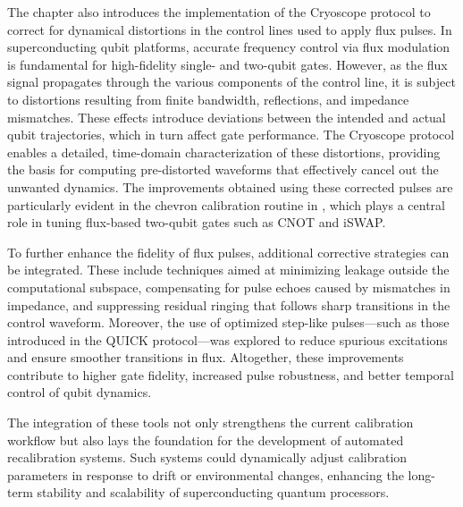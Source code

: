 The chapter also introduces the implementation of the Cryoscope protocol to correct for dynamical distortions in the control lines used to apply flux pulses. 
In superconducting qubit platforms, accurate frequency control via flux modulation is fundamental for high-fidelity single- and two-qubit gates. 
However, as the flux signal propagates through the various components of the control line, it is subject to distortions resulting from finite bandwidth, reflections, and impedance mismatches. 
These effects introduce deviations between the intended and actual qubit trajectories, which in turn affect gate performance. 
The Cryoscope protocol enables a detailed, time-domain characterization of these distortions, providing the basis for computing pre-distorted waveforms that effectively cancel out the unwanted dynamics. 
The improvements obtained using these corrected pulses are particularly evident in the chevron calibration routine in \Qibocal, which plays a central role in tuning flux-based two-qubit gates such as CNOT and iSWAP.

To further enhance the fidelity of flux pulses, additional corrective strategies can be integrated. 
These include techniques aimed at minimizing leakage outside the computational subspace, compensating for pulse echoes caused by mismatches in impedance, and suppressing residual ringing that follows sharp transitions in the control waveform. 
Moreover, the use of optimized step-like pulses—such as those introduced in the QUICK protocol—was explored to reduce spurious excitations and ensure smoother transitions in flux. 
Altogether, these improvements contribute to higher gate fidelity, increased pulse robustness, and better temporal control of qubit dynamics.

The integration of these tools not only strengthens the current calibration workflow but also lays the foundation for the development of automated recalibration systems. 
Such systems could dynamically adjust calibration parameters in response to drift or environmental changes, enhancing the long-term stability and scalability of superconducting quantum processors.